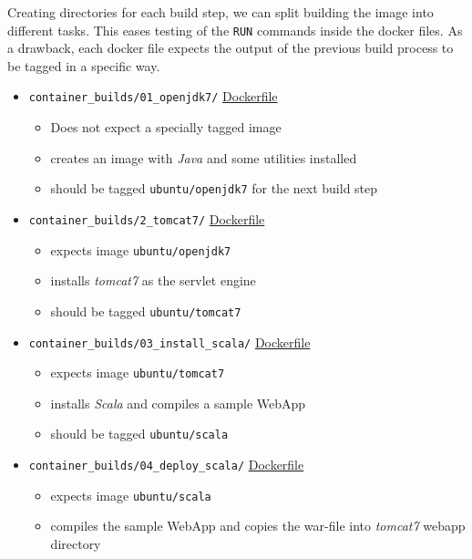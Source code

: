 \documentclass[captions=tableheading]{article}
\begin{document}
Creating directories for each build step, we can split building the image into different tasks. This eases testing of the \texttt{RUN} commands inside the docker files. As a drawback, each docker file expects the output of the previous build process to be tagged in a specific way. 
\begin{itemize}
\item \texttt{container\_builds/01\_openjdk7/} \href{file:///debiandata/michael/elemica/docker/poc-docker-jenkins/container_builds/01_openjdk7/Dockerfile}{Dockerfile}
\begin{itemize}
\item Does not expect a specially  tagged image
\item creates an image with \emph{Java} and some utilities installed
\item should be tagged \texttt{ubuntu/openjdk7} for the next build step
\end{itemize}
\item \texttt{container\_builds/2\_tomcat7/} \href{file:///debiandata/michael/elemica/docker/poc-docker-jenkins/container_builds/02_tomcat7/Dockerfile}{Dockerfile}
\begin{itemize}
\item expects image \texttt{ubuntu/openjdk7}
\item installs \emph{tomcat7} as the servlet engine
\item should be tagged \texttt{ubuntu/tomcat7}
\end{itemize}
\item \texttt{container\_builds/03\_install\_scala/} \href{file:///debiandata/michael/elemica/docker/poc-docker-jenkins/container_builds/03_install_scala/Dockerfile}{Dockerfile}
\begin{itemize}
\item expects image \texttt{ubuntu/tomcat7}
\item installs \emph{Scala} and compiles a sample WebApp
\item should be tagged \texttt{ubuntu/scala}
\end{itemize}
\item \texttt{container\_builds/04\_deploy\_scala/} \href{file:///debiandata/michael/elemica/docker/poc-docker-jenkins/container_builds/04_deploy_scala/Dockerfile}{Dockerfile}
\begin{itemize}
\item expects image \texttt{ubuntu/scala}
\item compiles the sample WebApp and copies the war-file into \emph{tomcat7} webapp directory
\end{itemize}
\end{itemize}
\end{document}
